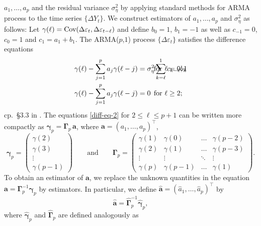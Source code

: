 $a_1,\ldots,a_p$ and the residual variance $\sigma_\eta^2$ by applying 
standard methods for ARMA process to the time series $\{ \Delta Y_t \}$.
We construct estimators of $a_1,\ldots,a_p$ and $\sigma_\eta^2$ as follows: 
Let $\gamma(\ell) = \textnormal{Cov}(\Delta \varepsilon_t, \Delta \varepsilon_{t-\ell})$ 
and define $b_0 = 1$, $b_1 = -1$ as well as $c_{-1} = 0$, $c_0 = 1$ and $c_1 
= a_1 + b_1$. The ARMA($p$,$1$) process $\{ \Delta \varepsilon_t \}$ 
satisfies the difference equations
\begin{align}
\gamma(\ell) - \sum\limits_{j=1}^p a_j \gamma(\ell-j) & = \sigma_\eta^2 
\sum_{k=\ell}^1 c_{k-\ell} b_k \hspace{-2cm} & & \text{for } \ell = 0,1 
\label{diff-eq-1} \\
\gamma(\ell) - \sum\limits_{j=1}^p a_j \gamma(\ell-j) & = 0 \hspace{-2cm} & 
& \text{for } \ell \ge 2; \label{diff-eq-2}
\end{align}
cp.\ \S3.3 in \cite{BrockwellDavis1991}. The equations \eqref{diff-eq-2} for 
$2 \le \ell \le p+1$ can be
written more compactly as $\boldsymbol{\gamma}_p = \boldsymbol{\Gamma}_p \, 
\boldsymbol{a}$, where $\boldsymbol{a} = (a_1,\ldots,a_p)^\top$,
\[ \boldsymbol{\gamma}_p =
\begin{pmatrix}
\gamma(2) \\ \gamma(3) \\ \vdots \\ \gamma(p-1)
\end{pmatrix}
\qquad \text{and} \qquad
\boldsymbol{\Gamma}_p =
\begin{pmatrix}
\gamma(1) & \gamma(0)  & \dots  & \gamma(p-2) \\
\gamma(2) & \gamma(1)  & \dots  & \gamma(p-3) \\
\vdots  & \vdots  &  \ddots & \vdots  \\
\gamma(p) & \gamma(p-1) & \dots  & \gamma(1)
\end{pmatrix}. \]
To obtain an estimator of $\boldsymbol{a}$, we replace the unknown 
quantities in the equation $\boldsymbol{a} = \boldsymbol{\Gamma}_p^{-1} 
\boldsymbol{\gamma}_p$ by estimators. In particular, we define 
$\widehat{\boldsymbol{a}} = (\widehat{a}_1,\ldots,\widehat{a}_p)^\top$ by
\begin{equation}\label{est-AR-par}
\widehat{\boldsymbol{a}} = \widehat{\boldsymbol{\Gamma}}_p^{-1}
\widehat{\boldsymbol{\gamma}}_p,
\end{equation}
where $\widehat{\boldsymbol{\gamma}}_p$ and 
$\widehat{\boldsymbol{\Gamma}}_p$ are defined analogously as 
